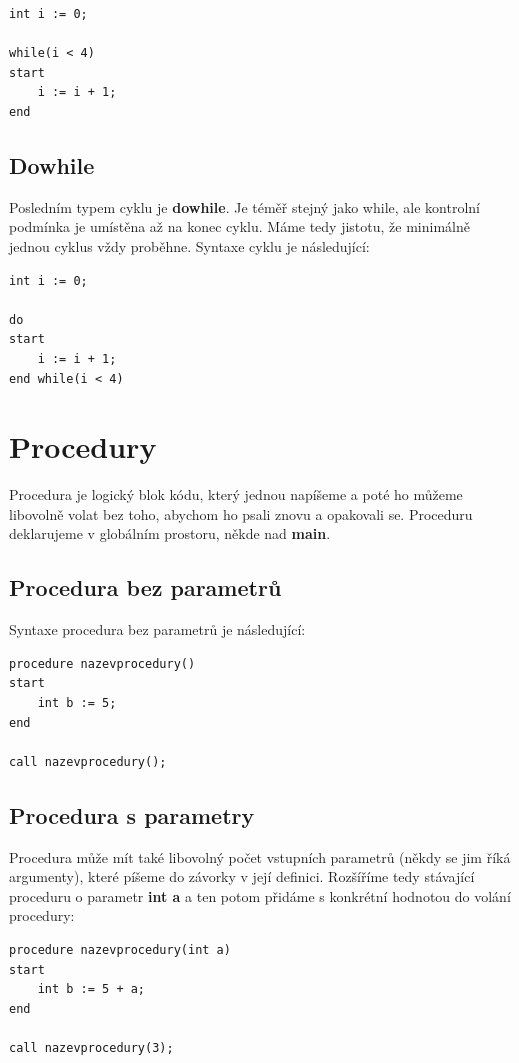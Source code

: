 \documentclass[12pt]{report}
\begin{document}
\begin{verbatim}
int i := 0;

while(i < 4)
start
    i := i + 1;
end
\end{verbatim}

\subsection{Do\textendash while}
Posledním typem cyklu je \textbf{do\textendash while}. Je téměř stejný jako while, ale kontrolní podmínka je umístěna až na konec cyklu. Máme tedy jistotu, že minimálně jednou cyklus vždy proběhne. Syntaxe cyklu je následující:

\begin{verbatim}
int i := 0;

do
start
    i := i + 1; 
end while(i < 4)
\end{verbatim}


\section{Procedury}
Procedura je logický blok kódu, který jednou napíšeme a poté ho můžeme libovolně volat bez toho, abychom ho psali znovu a opakovali se. Proceduru deklarujeme v globálním prostoru, někde nad \textbf{main}.

\subsection{Procedura bez parametrů}
Syntaxe procedura bez parametrů je následující:
\begin{verbatim}
procedure nazevprocedury()
start
    int b := 5;
end

call nazevprocedury();
\end{verbatim}


\subsection{Procedura s parametry}
Procedura může mít také libovolný počet vstupních parametrů (někdy se jim říká argumenty), které píšeme do závorky v její definici. Rozšíříme tedy stávající proceduru o parametr \textbf{int a} a ten potom přidáme s konkrétní hodnotou do volání procedury:
\begin{verbatim}
procedure nazevprocedury(int a)
start
    int b := 5 + a;
end

call nazevprocedury(3);
\end{verbatim}
\end{document}
